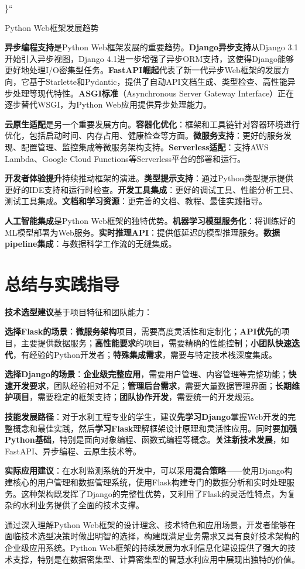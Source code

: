 \}``

 Python Web框架发展趋势

\textbf{异步编程支持}是Python Web框架发展的重要趋势。\textbf{Django异步支持}从Django 3.1开始引入异步视图，Django 4.1进一步增强了异步ORM支持，这使得Django能够更好地处理I/O密集型任务。\textbf{FastAPI崛起}代表了新一代异步Web框架的发展方向，它基于Starlette和Pydantic，提供了自动API文档生成、类型检查、高性能异步处理等现代特性。\textbf{ASGI标准}（Asynchronous Server Gateway Interface）正在逐步替代WSGI，为Python Web应用提供异步处理能力。

\textbf{云原生适配}是另一个重要发展方向。\textbf{容器化优化}：框架和工具链针对容器环境进行优化，包括启动时间、内存占用、健康检查等方面。\textbf{微服务支持}：更好的服务发现、配置管理、监控集成等微服务架构支持。\textbf{Serverless适配}：支持AWS Lambda、Google Cloud Functions等Serverless平台的部署和运行。

\textbf{开发者体验提升}持续推动框架的演进。\textbf{类型提示支持}：通过Python类型提示提供更好的IDE支持和运行时检查。\textbf{开发工具集成}：更好的调试工具、性能分析工具、测试工具集成。\textbf{文档和学习资源}：更完善的文档、教程、最佳实践指导。

\textbf{人工智能集成}是Python Web框架的独特优势。\textbf{机器学习模型服务化}：将训练好的ML模型部署为Web服务。\textbf{实时推理API}：提供低延迟的模型推理服务。\textbf{数据pipeline集成}：与数据科学工作流的无缝集成。

\section{总结与实践指导}

\textbf{技术选型建议}基于项目特征和团队能力：

\textbf{选择Flask的场景}：\textbf{微服务架构}项目，需要高度灵活性和定制化；\textbf{API优先}的项目，主要提供数据服务；\textbf{高性能要求}的项目，需要精确的性能控制；\textbf{小团队快速迭代}，有经验的Python开发者；\textbf{特殊集成需求}，需要与特定技术栈深度集成。

\textbf{选择Django的场景}：\textbf{企业级完整应用}，需要用户管理、内容管理等完整功能；\textbf{快速开发要求}，团队经验相对不足；\textbf{管理后台需求}，需要大量数据管理界面；\textbf{长期维护项目}，需要稳定的框架支持；\textbf{团队协作开发}，需要统一的开发规范。

\textbf{技能发展路径}：对于水利工程专业的学生，建议\textbf{先学习Django}掌握Web开发的完整概念和最佳实践，然后\textbf{学习Flask}理解框架设计原理和灵活性应用。同时要\textbf{加强Python基础}，特别是面向对象编程、函数式编程等概念。\textbf{关注新技术发展}，如FastAPI、异步编程、云原生技术等。

\textbf{实际应用建议}：在水利监测系统的开发中，可以采用\textbf{混合策略}------使用Django构建核心的用户管理和数据管理系统，使用Flask构建专门的数据分析和实时处理服务。这种架构既发挥了Django的完整性优势，又利用了Flask的灵活性特点，为复杂的水利业务提供了全面的技术支撑。

通过深入理解Python Web框架的设计理念、技术特色和应用场景，开发者能够在面临技术选型决策时做出明智的选择，构建既满足业务需求又具有良好技术架构的企业级应用系统。Python Web框架的持续发展为水利信息化建设提供了强大的技术支撑，特别是在数据密集型、计算密集型的智慧水利应用中展现出独特的价值。
